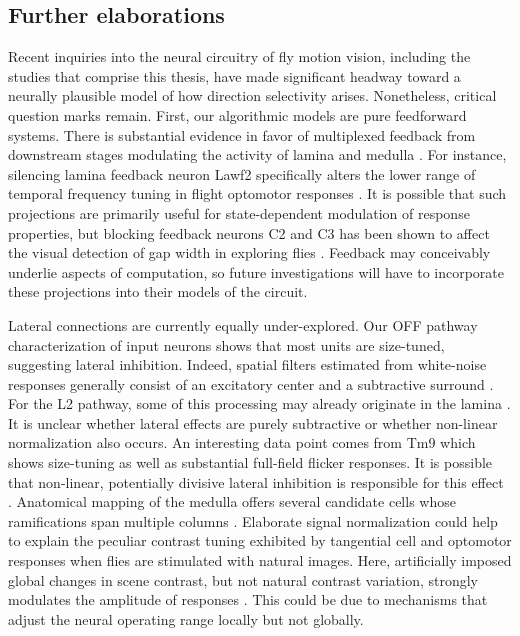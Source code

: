 \subsection{Further elaborations}
Recent inquiries into the neural circuitry of fly motion vision, including the studies that comprise this thesis, have made significant headway toward a neurally plausible model of how direction selectivity arises. Nonetheless, critical question marks remain. First, our algorithmic models are pure feedforward systems. There is substantial evidence in favor of multiplexed feedback from downstream stages modulating the activity of lamina and medulla \citep{Fischbach:1989uw,Takemura:2017aa}. For instance, silencing lamina feedback neuron Lawf2 specifically alters the lower range of temporal frequency tuning in flight optomotor responses \citep{Tuthill:2014gc}. It is possible that such projections are primarily useful for state-dependent modulation of response properties, but blocking feedback neurons C2 and C3 has been shown to affect the visual detection of gap width in exploring flies \citep{Triphan:2016aa}. Feedback may conceivably underlie aspects of computation, so future investigations will have to incorporate these projections into their models of the circuit.

Lateral connections are currently equally under-explored. Our OFF pathway characterization of input neurons shows that most units are size-tuned, suggesting lateral inhibition. Indeed, spatial filters estimated from white-noise responses generally consist of an excitatory center and a subtractive surround \citep{Arenz:2017aa}. For the L2 pathway, some of this processing may already originate in the lamina \citep{Freifeld:2013gu}. It is unclear whether lateral effects are purely subtractive or whether non-linear normalization also occurs. An interesting data point comes from Tm9 which shows size-tuning as well as substantial full-field flicker responses. It is possible that non-linear, potentially divisive lateral inhibition is responsible for this effect \citep{Carandini:2012fma}. Anatomical mapping of the medulla offers several candidate cells whose ramifications span multiple columns \citep{Fischbach:1989uw}. Elaborate signal normalization could help to explain the peculiar contrast tuning exhibited by tangential cell and optomotor responses when flies are stimulated with natural images. Here, artificially imposed global changes in scene contrast, but not natural contrast variation, strongly modulates the amplitude of responses \citep[see our work as well as][]{Straw:2008hh}. This could be due to mechanisms that adjust the neural operating range locally but not globally.

